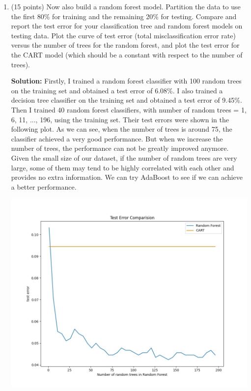 \documentclass[twoside,10pt]{article}
\begin{document}
\begin{enumerate}
\begin{enumerate}
\item (15 points) Now also build a random forest model. Partition the data to use the first 80\% for training and the remaining 20\% for testing. Compare and report the test error for your classification tree and random forest models on testing data. Plot the curve of test error (total misclassification error rate) versus the number of trees for the random forest, and plot the test error for the CART model (which should be a constant with respect to the number of trees). 
\begin{tcolorbox}
\textbf{Solution:}
Firstly, I trained a random forest classifier with 100 random trees on the training set and obtained a test error of  6.08\%.  I also trained a decision tree classifier on the training set and obtained a test error of 9.45\%. \\

Then I trained 40 random forest classifiers, with number of random trees = 1, 6, 11, ..., 196, using the training set. Their test errors were shown in the following plot. As we can see, when the number of trees is around 75, the classifier achieved a very good performance. But when we increase the number of trees, the performance can not be greatly improved anymore. Given the small size of our dataset, if the number of random trees are very large, some of them may tend to be highly correlated with each other and provides no extra information. We can try AdaBoost to see if we can achieve a better performance. 
\begin{center}
\includegraphics[width =.6 \textwidth]{images/test_error.jpg} 
\end{center}
\end{tcolorbox}


\end{enumerate}
\end{enumerate}
\end{document}
